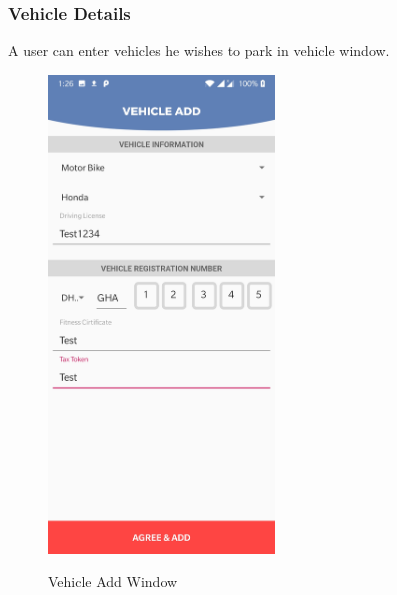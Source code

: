 \documentclass[12pt, english]{article}
\begin{document}
\subsubsection{Vehicle Details}
A user can enter vehicles he wishes to park in vehicle window.
\begin{figure}[h!]
        \begin{minipage}[b]{1\linewidth}
        \centering
        \includegraphics[width=6cm]{Vehicle/VehicleEditActivity_used_for_adding_vehicle.jpg}
        \label{arch6}
        \caption{Vehicle Add Window}
        \end{minipage}
\end{figure}
\end{document}

